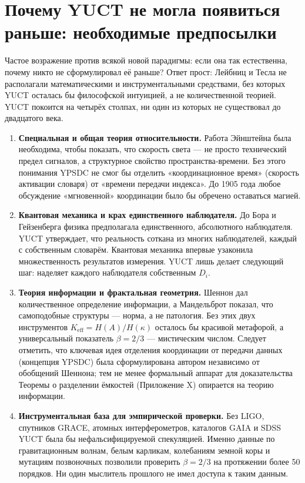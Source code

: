 \documentclass[12pt,a4paper]{article}
\begin{document}
	\section{Почему YUCT не могла появиться раньше: необходимые предпосылки}
	\label{sec:prerequisites}
	
	Частое возражение против всякой новой парадигмы: если она так естественна, почему никто не сформулировал её раньше? Ответ прост: Лейбниц и Тесла не располагали математическими и инструментальными средствами, без которых YUCT осталась бы философской интуицией, а не количественной теорией. YUCT покоится на четырёх столпах, ни один из которых не существовал до двадцатого века.
	
	\begin{enumerate}[leftmargin=*, label=\textbf{\arabic*.}]
		\item \textbf{Специальная и общая теория относительности.} Работа Эйнштейна была необходима, чтобы показать, что скорость света — не просто технический предел сигналов, а структурное свойство пространства‑времени. Без этого понимания YPSDC не смог бы отделить «координационное время» (скорость активации словаря) от «времени передачи индекса». До 1905 года любое обсуждение «мгновенной» координации было бы обречено оставаться магией.
		
		\item \textbf{Квантовая механика и крах единственного наблюдателя.} До Бора и Гейзенберга физика предполагала единственного, абсолютного наблюдателя. YUCT утверждает, что реальность соткана из многих наблюдателей, каждый с собственным словарём. Квантовая механика впервые узаконила множественность результатов измерения. YUCT лишь делает следующий шаг: наделяет каждого наблюдателя собственным \(D_i\).
		
		\item \textbf{Теория информации и фрактальная геометрия.} Шеннон дал количественное определение информации, а Мандельброт показал, что самоподобные структуры — норма, а не патология. Без этих двух инструментов \(K_{\mathrm{eff}} = H(A)/H(\kappa)\) осталось бы красивой метафорой, а универсальный показатель \(\beta=2/3\) — мистическим числом. Следует отметить, что ключевая идея отделения координации от передачи данных (концепция YPSDC) была сформулирована автором независимо от обобщений Шеннона; тем не менее формальный аппарат для доказательства Теоремы о разделении ёмкостей (Приложение X) опирается на теорию информации.
		
		\item \textbf{Инструментальная база для эмпирической проверки.} Без LIGO, спутников GRACE, атомных интерферометров, каталогов GAIA и SDSS YUCT была бы нефальсифицируемой спекуляцией. Именно данные по гравитационным волнам, белым карликам, колебаниям земной коры и мутациям позвоночных позволили проверить \(\beta=2/3\) на протяжении более 50 порядков. Ни один мыслитель прошлого не имел доступа к таким данным.
	\end{enumerate}
	
\end{document}

